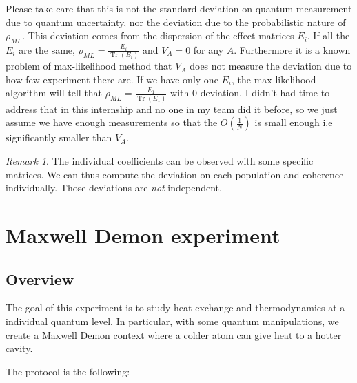 \documentclass[10pt,a4paper]{report}
\theoremstyle{plain}
\theoremstyle{definition}
\theoremstyle{remark}
\newtheorem*{rem}{Remark}
\DeclareMathOperator{\Tr}{Tr}
\newcommand{\trnorm}[1]{\frac{#1}{\Tr\left({#1}\right)}}
\newcommand{\ml}{_{M\!L}}
\begin{document}
Please take care that this is not the standard deviation on quantum measurement
due to quantum uncertainty, nor the deviation due to the probabilistic nature of
$\rho\ml$. This deviation comes from the dispersion of the effect matrices
$E_i$. If all the $E_i$ are the same, $\rho\ml = \trnorm{E_i}$ and $V_A = 0$ for
any $A$. Furthermore it is a known problem of max-likelihood method that $V_A$
does not measure the deviation due to how few experiment there are. If we have
only one $E_i$, the max-likelihood algorithm will tell that $\rho\ml =
\trnorm{E_1}$ with 0 deviation. I didn't had time to address that in this
internship and no one in my team did it before, so we just assume we have
enough measurements so that the $O(\frac1N)$ is small enough i.e significantly
smaller than $V_A$.

\begin{rem} The individual coefficients can be observed with some specific matrices.
  We can thus compute the deviation on each population and coherence individually.
  Those deviations are \emph{not} independent.
\end{rem}


\section{Maxwell Demon experiment}

\subsection{Overview}

The goal of this experiment is to study heat exchange and thermodynamics at a
individual quantum level. In particular, with some quantum manipulations, we
create a Maxwell Demon context where a colder atom can give heat to a hotter
cavity.

The protocol is the following:
\end{document}

